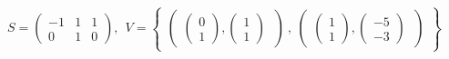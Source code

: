 
\begin{figure}[H]
\[
    S = \begin{pmatrix}
        -1 & 1 & 1 \\
        0 & 1 & 0
    \end{pmatrix}, \ \
    V = \begin{Bmatrix}
        \begin{pmatrix}
              \begin{pmatrix}
                    0 \\
                    1
               \end{pmatrix},
               \begin{pmatrix}
                     1 \\
                     1
               \end{pmatrix}
        \  \end{pmatrix}\ , \
        \begin{pmatrix}
               \begin{pmatrix}
                    1 \\
                    1
               \end{pmatrix},
               \begin{pmatrix}
                    -5 \\
                    -3
              \end{pmatrix}
        \ \end{pmatrix}
    \end{Bmatrix}
\]
\end{figure}